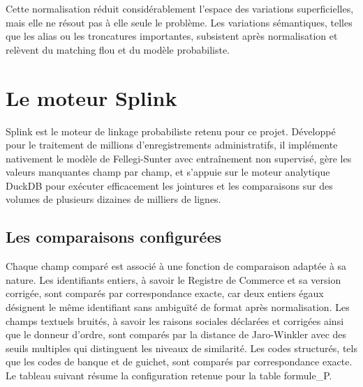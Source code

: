 \noindent Cette normalisation réduit considérablement l'espace des variations superficielles, mais elle ne résout pas à elle seule le problème. Les variations sémantiques, telles que les alias ou les troncatures importantes, subsistent après normalisation et relèvent du matching flou et du modèle probabiliste.

\section{Le moteur Splink}

Splink est le moteur de linkage probabiliste retenu pour ce projet. Développé pour le traitement de millions d'enregistrements administratifs, il implémente nativement le modèle de Fellegi-Sunter avec entraînement non supervisé, gère les valeurs manquantes champ par champ, et s'appuie sur le moteur analytique DuckDB pour exécuter efficacement les jointures et les comparaisons sur des volumes de plusieurs dizaines de milliers de lignes.

\subsection{Les comparaisons configurées}

Chaque champ comparé est associé à une fonction de comparaison adaptée à sa nature. Les identifiants entiers, à savoir le Registre de Commerce et sa version corrigée, sont comparés par correspondance exacte, car deux entiers égaux désignent le même identifiant sans ambiguïté de format après normalisation. Les champs textuels bruités, à savoir les raisons sociales déclarées et corrigées ainsi que le donneur d'ordre, sont comparés par la distance de Jaro-Winkler avec des seuils multiples qui distinguent les niveaux de similarité. Les codes structurés, tels que les codes de banque et de guichet, sont comparés par correspondance exacte. Le tableau suivant résume la configuration retenue pour la table formule\_P.

